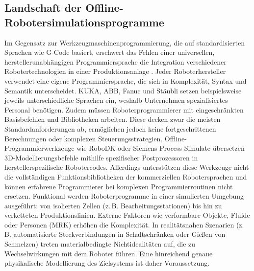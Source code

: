 \subsection{Landschaft der Offline-Robotersimulationsprogramme} Im Gegensatz zur
Werkzeugmaschinenprogrammierung, die auf standardisierten Sprachen wie G-Code
basiert, erschwert das Fehlen einer universellen, herstellerunabhängigen
Programmiersprache die Integration verschiedener Robotertechnologien in einer
Produktionsanlage . Jeder Roboterhersteller verwendet
eine eigene Programmiersprache, die sich in Komplexität, Syntax und Semantik
unterscheidet. KUKA, ABB, Fanuc und Stäubli setzen beispielsweise jeweils
unterschiedliche Sprachen ein, weshalb Unternehmen spezialisiertes Personal
benötigen. Zudem müssen Roboterprogrammierer mit eingeschränkten Basisbefehlen
und Bibliotheken arbeiten. Diese decken zwar die meisten Standardanforderungen
ab, ermöglichen jedoch keine fortgeschrittenen Berechnungen oder komplexen
Steuerungsstrategien. Offline-Programmierwerkzeuge wie RoboDK oder Siemens
Process Simulate übersetzen 3D-Modellierungsbefehle mithilfe spezifischer
Postprozessoren in herstellerspezifische Robotercodes. Allerdings unterstützen
diese Werkzeuge nicht die vollständigen Funktionsbibliotheken der kommerziellen
Robotersprachen und können erfahrene Programmierer bei komplexen
Programmierroutinen nicht ersetzen. Funktional werden
Roboterprogramme in einer simulierten Umgebung ausgeführt: von isolierten Zellen
(z.\,B. Bearbeitungsstationen) bis hin zu verketteten Produktionslinien. Externe
Faktoren wie verformbare Objekte, Fluide oder Personen (MRK) erhöhen die
Komplexität. In realitätsnahen Szenarien (z.\,B. automatisierte
Steckverbindungen in Schaltschränken oder Gießen von Schmelzen) treten
materialbedingte Nichtidealitäten auf, die zu Wechselwirkungen mit dem Roboter
führen. Eine hinreichend genaue physikalische Modellierung des Zielsystems ist
daher Voraussetzung.

